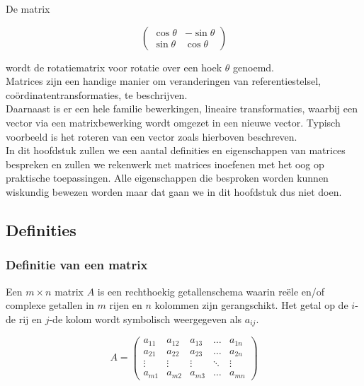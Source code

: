 De matrix

\[
\left( \begin{array}{rr} \cos \theta & -\sin \theta \\ \sin \theta & \cos \theta \end{array} \right)
\]

wordt de rotatiematrix voor rotatie over een hoek $\theta$ genoemd.\\

Matrices zijn een handige manier om veranderingen van referentiestelsel, co\"{o}rdinatentransformaties, te beschrijven.\\
Daarnaast is er een hele familie bewerkingen, lineaire transformaties, waarbij een vector via een matrixbewerking wordt omgezet in een nieuwe vector. Typisch voorbeeld is het roteren van een vector zoals hierboven beschreven.\\

In dit hoofdstuk zullen we een aantal definities en eigenschappen van matrices bespreken en zullen we rekenwerk met matrices inoefenen met het oog op praktische toepassingen. Alle eigenschappen die besproken worden kunnen wiskundig bewezen worden maar dat gaan we in dit hoofdstuk dus niet doen.\\

\newpage

\subsection{Definities}


\subsubsection{Definitie van een matrix}

\begin{definitie}
	Een $m \times n$ matrix $A$ is een rechthoekig getallenschema waarin re\"{e}le en/of complexe getallen in $m$ rijen en $n$ kolommen zijn gerangschikt. Het getal op de $i$-de rij en $j$-de kolom wordt symbolisch weergegeven als $a_{ij}$.

\end{definitie}
\[
A= \left( \begin{matrix}
a_{11} & a_{12} & a_{13} & \ldots & a_{1n} \\
a_{21} & a_{22} & a_{23} & \ldots & a_{2n} \\
\vdots & \vdots & \vdots & \ddots & \vdots \\
a_{m1} & a_{m2} & a_{m3} & \ldots & a_{mn}
\end{matrix} \right)
\]

